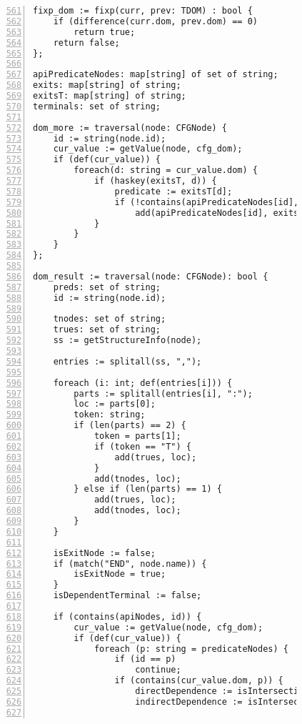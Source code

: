 \begin{figure}[ht!]
\begin{lstlisting}[numbers=left, tabsize=4, escapechar=@, caption={API Usage Mining Analysis},label={lst:aun-code},  firstline = 561, firstnumber = 561, lastline = 621]
fixp_dom := fixp(curr, prev: TDOM) : bool {
 	if (difference(curr.dom, prev.dom) == 0)
 		return true;	
 	return false;
};

apiPredicateNodes: map[string] of set of string;
exits: map[string] of string;
exitsT: map[string] of string;
terminals: set of string;

dom_more := traversal(node: CFGNode) {
    id := string(node.id);
    cur_value := getValue(node, cfg_dom);
    if (def(cur_value)) {
        foreach(d: string = cur_value.dom) {
            if (haskey(exitsT, d)) {
                predicate := exitsT[d];  
                if (!contains(apiPredicateNodes[id], predicate))
                    add(apiPredicateNodes[id], exits[d]);
            }
        }
    }
};

dom_result := traversal(node: CFGNode): bool {
    preds: set of string;
    id := string(node.id);
    
    tnodes: set of string;
    trues: set of string;
    ss := getStructureInfo(node);
    
    entries := splitall(ss, ",");
    
    foreach (i: int; def(entries[i])) {
    	parts := splitall(entries[i], ":"); 
    	loc := parts[0]; 
    	token: string;
    	if (len(parts) == 2) {
    	    token = parts[1];
    		if (token == "T") {
    		    add(trues, loc);    
    		}
            add(tnodes, loc);
    	} else if (len(parts) == 1) {
    	    add(trues, loc);  
    		add(tnodes, loc);
    	}
    }
    
    isExitNode := false;
    if (match("END", node.name)) {
        isExitNode = true;
    }
    isDependentTerminal := false;

    if (contains(apiNodes, id)) {
        cur_value := getValue(node, cfg_dom);
        if (def(cur_value)) {
            foreach (p: string = predicateNodes) {
                if (id == p)
                    continue;
                if (contains(cur_value.dom, p)) {
                    directDependence := isIntersectionNotNull(variables[id], variables[p]);
                    indirectDependence := isIntersectionNotNull(allVars, variables[p]);
                    

\end{lstlisting}
\end{figure}

